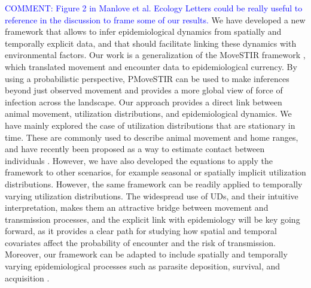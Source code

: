 \documentclass[letterpaper]{article}
\begin{document}
\textcolor{blue}{COMMENT: Figure 2 in Manlove et al. Ecology Letters could be really useful to reference in the discussion to frame some of our results.}
We have developed a new framework that allows to infer epidemiological dynamics from spatially and temporally explicit data, and that should facilitate linking these dynamics with environmental factors. Our work is a generalization of the MoveSTIR framework \citep{Wilber2022}, which translated movement and encounter data to epidemiological currency. By using a probabilistic perspective, PMoveSTIR can be used to make inferences beyond just observed movement and provides a more global view of force of infection across the landscape. Our approach provides a direct link between animal movement, utilization distributions, and epidemiological dynamics. We have mainly explored the case of utilization distributions that are stationary in time. These are commonly used to describe animal movement and home ranges, and have recently been proposed as a way to estimate contact between individuals \citep{Noonan2021}. However, we have also developed the equations to apply the framework to other scenarios, for example seasonal or spatially implicit utilization distributions. However, the same framework can be readily applied to temporally varying utilization distributions. The widespread use of UDs, and their intuitive interpretation, makes them an attractive bridge between movement and transmission processes, and the explicit link with epidemiology will be key going forward, as it provides a clear path for studying how spatial and temporal covariates affect the probability of encounter and the risk of transmission. Moreover, our framework can be adapted to include spatially and temporally varying epidemiological processes such as parasite deposition, survival, and acquisition \citep{Merkle2018,VanderWaal2017}.
\end{document}
